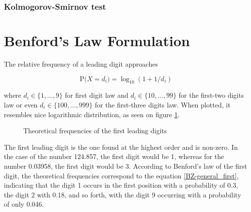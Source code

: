 \subsubsection*{Kolmogorov-Smirnov test}

\section{Benford's Law Formulation}

The relative frequency of a leading digit approaches 

\begin{equation}
    \label{BZ-general_first}
\text{P(} X = d_i\text{)}= \log_{10}(1+1/d_i)
\end{equation}

where $d_i \in \{1,\dots,9\}$ for first digit law and $d_i \in \{10,\dots,99\}$ for the first-two digits law or even $d_i \in \{100,\dots,999\}$ for the first-three digits law. When plotted, it resembles nice logarithmic distribution, as seen on figure \ref{fig:FL}.  \cite{Cerqueti2202,Hronova2023,Newcomb1881}

\begin{figure}[h]
    \centering
    \caption{Theoretical frequencies of the first leading digits}
    \label{fig:FL}
    \pgfplotsset{width=8.5cm,compat=1.18}
\end{figure}

The first leading digit is the one found at the highest order and is non-zero. In the case of the number 124.857, the first digit would be 1, whereas for the number 0.03958, the first digit would be 3. According to Benford's law of the first digit, the theoretical frequencies correspond to the equation \ref{BZ-general_first}, indicating that the digit 1 occurs in the first position with a probability of 0.3, the digit 2 with 0.18, and so forth, with the digit 9 occurring with a probability of only 0.046.

